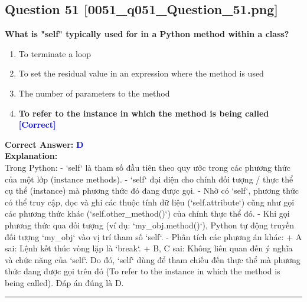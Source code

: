 \documentclass[11pt,a4paper]{article}
\begin{document}
\begin{minipage}{\textwidth}
\subsection*{Question 51 \quad \footnotesize{[0051_q051_Question_51.png]}}
\noindent \textbf{What is "self" typically used for in a Python method within a class?}

\begin{enumerate}[label=\Alph*.]
    \item To terminate a loop
    \item To set the residual value in an expression where the method is used
    \item The number of parameters to the method
    \item \textbf{To refer to the instance in which the method is being called} \hfill \textcolor{blue}{\textbf{[Correct]}}
\end{enumerate}

\noindent \textbf{Correct Answer:} \textcolor{blue}{\textbf{D}} \\[4pt]
\noindent \textbf{Explanation:}\\
Trong Python:\newline
- `self` là tham số đầu tiên theo quy ước trong các phương thức của một lớp (instance methods).\newline
- `self` đại diện cho chính đối tượng / thực thể cụ thể (instance) mà phương thức đó đang được gọi.\newline
- Nhờ có `self`, phương thức có thể truy cập, đọc và ghi các thuộc tính dữ liệu (`self.attribute`) cũng như gọi các phương thức khác (`self.other_method()`) của chính thực thể đó.\newline
- Khi gọi phương thức qua đối tượng (ví dụ: `my_obj.method()`), Python tự động truyền đối tượng `my_obj` vào vị trí tham số `self`.\newline
- Phân tích các phương án khác:\newline
  + A sai: Lệnh kết thúc vòng lặp là `break`.\newline
  + B, C sai: Không liên quan đến ý nghĩa và chức năng của `self`.\newline
Do đó, `self` dùng để tham chiếu đến thực thể mà phương thức đang được gọi trên đó (To refer to the instance in which the method is being called). Đáp án đúng là D.
\end{minipage}
\vspace{0.8cm}
\hrule
\vspace{0.5cm}
\end{document}
